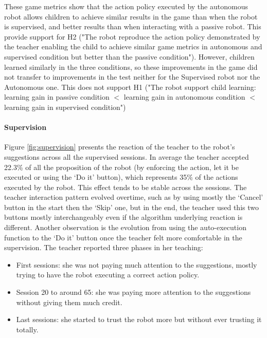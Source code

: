 These game metrics show that the action policy executed by the autonomous robot allows children to achieve similar results in the game than when the robot is supervised, and better results than when interacting with a passive robot. This provide support for H2 ("The robot reproduce the action policy demonstrated by the teacher enabling the child to achieve similar game metrics in autonomous and supervised condition but better than the passive condition"). However, children learned similarly in the three conditions, so these improvements in the game did not transfer to improvements in the test neither for the Supervised robot nor the Autonomous one. This does not support H1 ("The robot support child learning: learning gain in passive condition $<$ learning gain in autonomous condition $<$ learning gain in supervised condition")

\paragraph{Supervision}

Figure \ref{fig:supervision} presents the reaction of the teacher to the robot's suggestions across all the supervised sessions. In average the teacher accepted 22.3\% of all the proposition of the robot (by enforcing the action, let it be executed or using the `Do it' button), which represents 35\% of the actions executed by the robot. This effect tends to be stable across the sessions. The teacher interaction pattern evolved overtime, such as by using mostly the `Cancel' button in the start then the `Skip' one, but in the end, the teacher used this two buttons mostly interchangeably even if the algorithm underlying reaction is different. Another observation is the evolution from using the auto-execution function to the `Do it' button once the teacher felt more comfortable in the supervision. The teacher reported three phases in her teaching: 

\begin{itemize}
	\item First sessions: she was not paying much attention to the suggestions, mostly trying to have the robot executing a correct action policy.
	\item Session 20 to around 65: she was paying more attention to the suggestions without giving them much credit.
	\item Last sessions: she started to trust the robot more but without ever trusting it totally.
\end{itemize}

